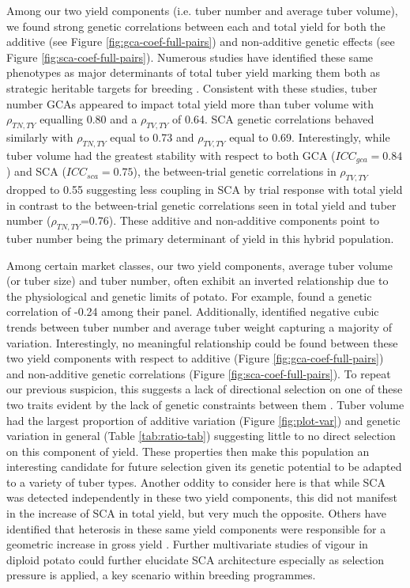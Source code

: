 \begin{refsection}
Among our two yield components (i.e. tuber number and average tuber volume), we found strong genetic correlations between each and total yield for both the additive (see Figure \ref{fig:gca-coef-full-pairs}) and non-additive genetic effects (see Figure \ref{fig:sca-coef-full-pairs}). Numerous studies have identified these same phenotypes as major determinants of total tuber yield marking them both as strategic heritable targets for breeding \parencite{Khayatnezhad2011, Thompson1984}. Consistent with these studies, tuber number GCAs appeared to impact total yield more than tuber volume with \(\rho_{TN,TY}\) equalling 0.80 and a \(\rho_{TV,TY}\) of 0.64. SCA genetic correlations behaved similarly with \(\rho_{TN,TY}\) equal to 0.73 and \(\rho_{TV,TY}\) equal to 0.69. Interestingly, while tuber volume had the greatest stability with respect to both GCA (\(ICC_{gca}=0.84\)) and SCA (\(ICC_{sca}=0.75\)), the between-trial genetic correlations in \(\rho_{TV,TY}\) dropped to 0.55 suggesting less coupling in SCA by trial response with total yield in contrast to the between-trial genetic correlations seen in total yield and tuber number (\(\rho_{TN,TY}\)=0.76). These additive and non-additive components point to tuber number being the primary determinant of yield in this hybrid population.

Among certain market classes, our two yield components, average tuber volume (or tuber size) and tuber number, often exhibit an inverted relationship due to the physiological and genetic limits of potato. For example, \parencite{Thompson1984} found a genetic correlation of -0.24 among their panel. Additionally, \parencite{Lemaga1990} identified negative cubic trends between tuber number and average tuber weight capturing a majority of variation. Interestingly, no meaningful relationship could be found between these two yield components with respect to additive (Figure \ref{fig:gca-coef-full-pairs}) and non-additive genetic correlations (Figure \ref{fig:sca-coef-full-pairs}). To repeat our previous suspicion, this suggests a lack of directional selection on one of these two traits evident by the lack of genetic constraints between them \parencite{Blows2009}. Tuber volume had the largest proportion of additive variation (Figure \ref{fig:plot-var}) and genetic variation in general (Table \ref{tab:ratio-tab}) suggesting little to no direct selection on this component of yield. These properties then make this population an interesting candidate for future selection given its genetic potential to be adapted to a variety of tuber types. Another oddity to consider here is that while SCA was detected independently in these two yield components, this did not manifest in the increase of SCA in total yield, but very much the opposite. Others have identified that heterosis in these same yield components were responsible for a geometric increase in gross yield \parencite{Tarn1977}. Further multivariate studies of vigour in diploid potato could further elucidate SCA architecture especially as selection pressure is applied, a key scenario within breeding programmes.


\end{refsection}
